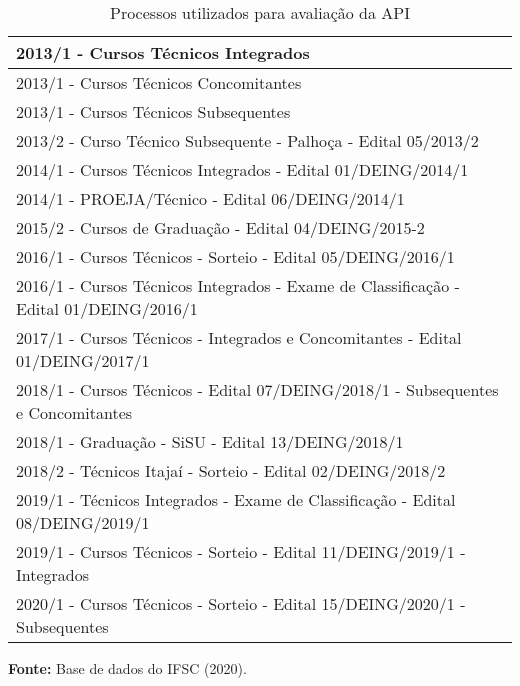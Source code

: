 \begin{table}[ht!]
\caption{Processos utilizados para avaliação da API}
\label{processos_utilizados}
\centering
\begin{tabular}{ |l| }
 \hline
2013/1 - Cursos Técnicos Integrados                                                        \\ \hline
2013/1 - Cursos Técnicos Concomitantes                                                     \\ \hline
2013/1 - Cursos Técnicos Subsequentes                                                      \\ \hline
2013/2 - Curso Técnico Subsequente - Palhoça - Edital 05/2013/2                            \\ \hline
2014/1 - Cursos Técnicos Integrados - Edital 01/DEING/2014/1                               \\ \hline
2014/1 - PROEJA/Técnico - Edital 06/DEING/2014/1                                           \\ \hline
2015/2 - Cursos de Graduação - Edital 04/DEING/2015-2                                      \\ \hline
2016/1 - Cursos Técnicos - Sorteio - Edital 05/DEING/2016/1                                \\ \hline
2016/1 - Cursos Técnicos Integrados - Exame de Classificação - Edital 01/DEING/2016/1      \\ \hline
2017/1 - Cursos Técnicos - Integrados e Concomitantes - Edital 01/DEING/2017/1             \\ \hline
2018/1 - Cursos Técnicos - Edital 07/DEING/2018/1 - Subsequentes e Concomitantes \\ \hline
2018/1 - Graduação - SiSU - Edital 13/DEING/2018/1                                         \\ \hline
2018/2 - Técnicos Itajaí - Sorteio - Edital 02/DEING/2018/2                                \\ \hline
2019/1 - Técnicos Integrados - Exame de Classificação - Edital 08/DEING/2019/1             \\ \hline
2019/1 - Cursos Técnicos - Sorteio - Edital 11/DEING/2019/1 - Integrados                   \\ \hline
2020/1 - Cursos Técnicos - Sorteio - Edital 15/DEING/2020/1 - Subsequentes                 \\ \hline
 \end{tabular} 
  \par\medskip\textbf{Fonte:} Base de dados do IFSC (2020). \par\medskip
\end{table}
